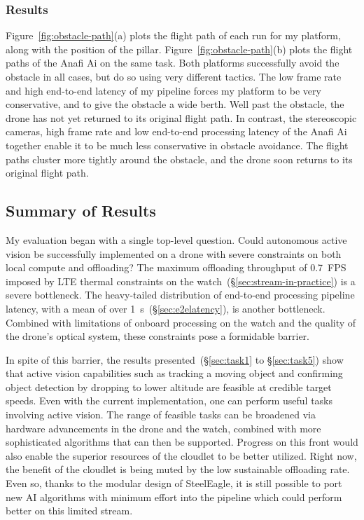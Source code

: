 \subsubsection{Results}
\label{sec:task5-results}

Figure~\ref{fig:obstacle-path}(a) plots the flight path of each run
for my platform, along with the position of the pillar.
Figure~\ref{fig:obstacle-path}(b) plots the flight paths of the Anafi
Ai on the same task.  Both platforms successfully avoid the obstacle
in all cases, but do so using very different tactics. The
low frame rate and high end-to-end latency of my pipeline forces my
platform to be very conservative, and to give the obstacle a wide
berth.  Well past the obstacle, the drone has not yet returned to its
original flight path.  In contrast, the stereoscopic cameras, high
frame rate and low end-to-end processing latency of the Anafi Ai
together enable it to be much less conservative in obstacle avoidance.
The flight paths cluster more tightly around the obstacle, and the drone
soon returns to its original flight path.

\subsection{Summary of Results}
\label{sec:take-away}

My evaluation began with a single top-level question.  Could
autonomous active vision be successfully implemented on a drone with
severe constraints on both local compute and offloading?  The maximum
offloading throughput of 0.7~FPS imposed by LTE thermal constraints on
the watch~(\S\ref{sec:stream-in-practice}) is a severe bottleneck.  The
heavy-tailed distribution of end-to-end processing pipeline latency,
with a mean of over 1~s~(\S\ref{sec:e2elatency}), is another
bottleneck.  Combined with limitations of onboard processing on the
watch and the quality of the drone's optical system, these constraints
pose a formidable barrier.

In spite of this barrier, the results presented~(\S\ref{sec:task1} to
\S\ref{sec:task5}) show that active vision capabilities such as
tracking a moving object and confirming object detection by dropping
to lower altitude are feasible at credible target speeds.  Even with
the current implementation, one can perform useful tasks involving
active vision.  The range of feasible tasks can be broadened via
hardware advancements in the drone and the watch, combined with more
sophisticated algorithms that can then be supported.  Progress on this
front would also enable the superior resources of the cloudlet to be better
utilized.  Right now, the benefit of the cloudlet is being muted by the low
sustainable offloading rate. Even so, thanks to the modular design of SteelEagle, it is still possible to port new AI algorithms with minimum effort into the pipeline which could perform better on this limited stream.


